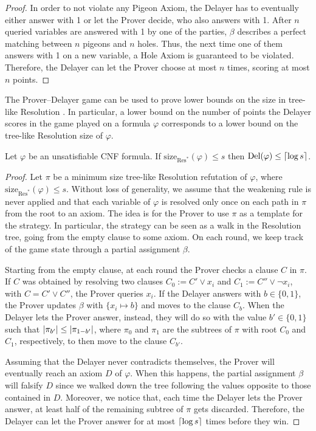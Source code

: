 \begin{proof}
    In order to not violate any Pigeon Axiom, the Delayer has to eventually either answer with 1 or let the Prover decide, who also answers with 1. After $n$ queried variables are answered with 1 by one of the parties, $\beta$ describes a perfect matching between $n$ pigeons and $n$ holes. Thus, the next time one of them answers with 1 on a new variable, a Hole Axiom is guaranteed to be violated. Therefore, the Delayer can let the Prover choose at most $n$ times, scoring at most $n$ points.
\end{proof}

The Prover--Delayer game can be used to prove lower bounds on the size in tree-like Resolution \cite{pudlak_dpll,arora_barak}. In particular, a lower bound on the number of points the Delayer scores in the game played on a formula $\varphi$ corresponds to a lower bound on the tree-like Resolution size of $\varphi$. 

\begin{theorem}
    \label{thm:prover_delayer}
    Let $\varphi$ be an unsatisfiable CNF formula. If $\mathrm{size}_{\mathrm{Res}^*}(\varphi) \leq s$ then $\mathrm{Del}(\varphi) \leq \left \lceil \log s \right \rceil$. 
\end{theorem}

\begin{proof}
    Let $\pi$ be a minimum size tree-like Resolution refutation of $\varphi$, where $\mathrm{size}_{\mathrm{Res}^*}(\varphi) \leq s$. Without loss of generality, we assume that the weakening rule is never applied and that each variable of $\varphi$ is resolved only once on each path in $\pi$ from the root to an axiom. The idea is for the Prover to use $\pi$ as a template for the strategy. In particular, the strategy can be seen as a walk in the Resolution tree, going from the empty clause to some axiom. On each round, we keep track of the game state through a partial assignment $\beta$.

    Starting from the empty clause, at each round the Prover checks a clause $C$ in $\pi$. If $C$ was obtained by resolving two clauses $C_0 := C' \lor x_i$ and $C_1 := C'' \lor \lnot x_i$, with $C = C' \lor C''$, the Prover queries $x_i$. If the Delayer answers with $b \in \{0,1\}$, the Prover updates $\beta$ with $\{x_i \mapsto b\}$ and moves to the clause $C_b$. When the Delayer lets the Prover answer, instead, they will do so with the value $b' \in \{0,1\}$ such that $\left|\pi_{b'}\right| \leq \left|\pi_{1-b'}\right|$, where $\pi_0$ and $\pi_1$ are the subtrees of $\pi$ with root $C_0$ and $C_1$, respectively, to then move to the clause $C_{b'}$.

    Assuming that the Delayer never contradicts themselves, the Prover will eventually reach an axiom $D$ of $\varphi$. When this happens, the partial assignment $\beta$ will falsify $D$ since we walked down the tree following the values opposite to those contained in $D$. Moreover, we notice that, each time the Delayer lets the Prover answer, at least half of the remaining subtree of $\pi$ gets discarded. Therefore, the Delayer can let the Prover answer for at most $\left \lceil \log s \right \rceil$ times before they win.
\end{proof}


